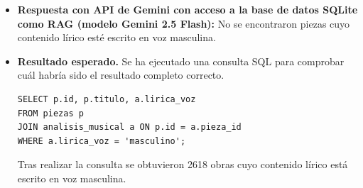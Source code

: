 \begin{itemize}
Si necesitas ayuda para identificar otras características musicales del archivo o si tienes alguna otra pregunta, estaré encantado de ayudarte."
\item \textbf{Respuesta con API de Gemini con acceso a la base de datos SQLite como RAG (modelo Gemini 2.5 Flash):} No se encontraron piezas cuyo contenido lírico esté escrito en voz masculina.  
\item \textbf{Resultado esperado.} Se ha ejecutado una consulta SQL para comprobar cuál habría sido el resultado completo correcto.
    \begin{verbatim}
SELECT p.id, p.titulo, a.lirica_voz
FROM piezas p
JOIN analisis_musical a ON p.id = a.pieza_id
WHERE a.lirica_voz = 'masculino';
    \end{verbatim}    
    Tras realizar la consulta se obtuvieron 2618 obras cuyo contenido lírico está escrito en voz masculina.

\end{itemize}

